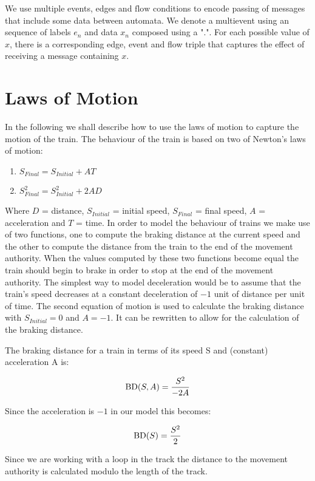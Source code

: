 \begin{myremark}
We use multiple events, edges and $\mathrm{flow}$ conditions to encode passing of messages that include some data between automata.  We denote a multievent using an sequence of labels $e_n$ and data $x_n$ composed using a ".".  For each possible value of $x$, there is a corresponding edge, event and flow triple that captures the effect of receiving a message containing $x$.
\end{myremark}

\section{Laws of Motion}\label{sec:lawsofmotion}
In the following we shall describe how to use the laws of motion to capture the motion of the train.
The behaviour of the train is based on two of Newton's laws of motion:
\begin{enumerate}
\item $S_{Final} = S_{Initial} +AT$
\item$S_{Final}^2 = S_{Initial}^2 +2AD$
\end{enumerate}
 Where $D$ = distance, $S_{Initial}$ = initial speed, $S_{Final}$ = final speed, $A$ = acceleration and $T$ = time. In order to model the behaviour of trains we make use of two functions, one to compute the braking distance at the current speed and the other to compute the distance from the train to the end of the movement authority. When the values computed by these two functions become equal the train should begin to brake in order to stop at the end of the movement authority. The simplest way to model deceleration would be to assume that the train's speed decreases at a constant deceleration of  $-1$ unit of distance per unit of time. The second equation of motion  is used to calculate the braking distance with $S_{Initial} = 0$ and $A = -1$. It can be rewritten to allow for the calculation of the braking distance.
\medskip

\begin{mydef}
The braking distance for a train in terms of its speed S and (constant) acceleration A is: 

$$\mathrm{BD}(S,A) = \frac{S^2}{-2A} $$

Since the acceleration is $-1$ in our model this becomes:

$$\mathrm{BD}(S) = \frac{S^2}{2}$$

\end{mydef}
\medskip
Since we are working with a loop in the track the distance to the movement authority is calculated modulo the length of the track. 
\medskip

